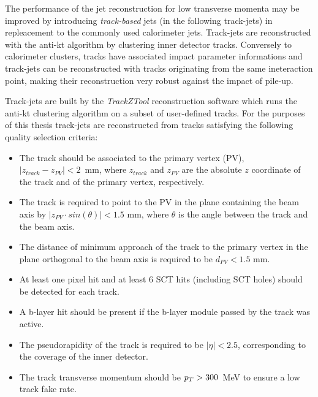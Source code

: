 The performance of the jet reconstruction for  low transverse momenta may be improved by introducing \emph{track-based} jets (in the following track-jets)
in repleacement to the commonly used calorimeter jets.
Track-jets are reconstructed with the anti-kt algorithm by  clustering inner detector tracks.
Conversely to calorimeter clusters, tracks have associated impact parameter informations and  track-jets can be reconstructed
with tracks originating from the same ineteraction point, making their reconstruction very robust against the impact of pile-up.

Track-jets are built by the \emph{TrackZTool} reconstruction software which runs the anti-kt clustering 
algorithm on a subset of user-defined tracks.
For the purposes of this thesis track-jets are reconstructed  from tracks satisfying  the following
quality selection criteria:
\begin{itemize}
\item The track should be associated to the primary vertex (PV), \\$|z_{track} - z_{PV}| < 2$~mm, where $z_{track}$ and $z_{PV}$ are
 the absolute $z$ coordinate of the track and of the primary vertex, respectively.
 
\item The track is required to point to the PV in the plane  containing the beam axis by 
	$|z_{PV} \cdot sin(\theta)| < 1.5$ mm, where $\theta$ is the angle between the track and the beam axis.

\item The distance of minimum approach of the track to the  primary vertex  
in the plane orthogonal to the beam axis is required to be $d_{PV} < 1.5$ mm.


\item At least one pixel hit and at least 6 SCT hits (including SCT holes) should be detected for each track.

\item A  b-layer hit should be present if the b-layer module passed by the track was active.

\item The pseudorapidity of the track is required to be $|\eta| < 2.5$, corresponding to the coverage of the inner detector.

\item The track transverse momentum should be $p_{T} > 300 $~MeV to ensure a low track fake rate.

\end{itemize}
